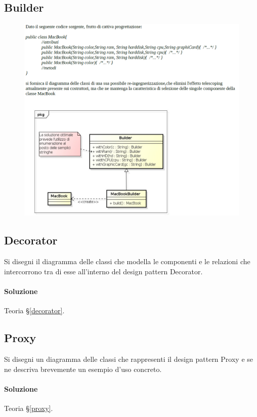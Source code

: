 \subsection{Builder}

\begin{figure}[H]\center
\includegraphics[width=1\textwidth]{res/img/Esercizi/es-builder}
\end{figure}

\subsection{Decorator}

Si disegni il diagramma delle classi che modella le componenti e le relazioni che intercorrono tra di esse all'interno del design pattern Decorator.

\paragraph{Soluzione} Teoria §\ref{decorator}.

\subsection{Proxy}

Si disegni un diagramma delle classi che rappresenti il design pattern Proxy e se ne descriva brevemente un esempio
d'uso concreto.

\paragraph{Soluzione} Teoria §\ref{proxy}.

